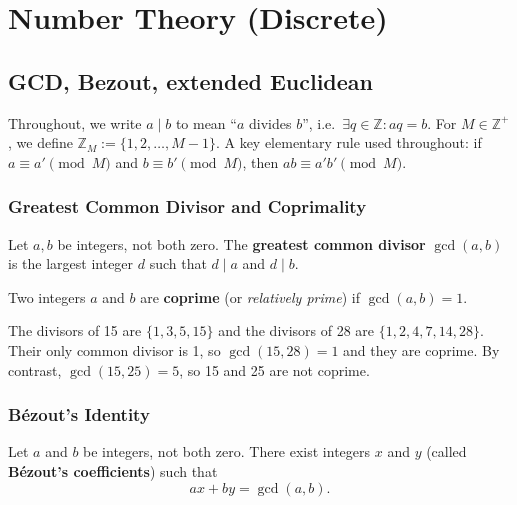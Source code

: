 
\section{Number Theory (Discrete)}

\subsection{GCD, Bezout, extended Euclidean}

\begin{remark}
Throughout, we write $a \mid b$ to mean ``$a$ divides $b$'', i.e.\ $\exists q \in \mathbb{Z} : aq = b$. For $M \in \mathbb{Z}^+$, we define $\mathbb{Z}_M := \{1, 2, \ldots, M-1\}$. A key elementary rule used throughout: if $a \equiv a' \pmod{M}$ and $b \equiv b' \pmod{M}$, then $ab \equiv a'b' \pmod{M}$.
\end{remark}

\subsubsection*{Greatest Common Divisor and Coprimality}

\begin{definition}
Let $a, b$ be integers, not both zero. The \textbf{greatest common divisor} $\gcd(a,b)$ is the largest integer $d$ such that $d \mid a$ and $d \mid b$.
\end{definition}

\begin{definition}
Two integers $a$ and $b$ are \textbf{coprime} (or \emph{relatively prime}) if $\gcd(a,b) = 1$.
\end{definition}

\begin{example}
The divisors of 15 are $\{1,3,5,15\}$ and the divisors of 28 are $\{1,2,4,7,14,28\}$. Their only common divisor is 1, so $\gcd(15,28)=1$ and they are coprime. By contrast, $\gcd(15,25)=5$, so 15 and 25 are not coprime.
\end{example}

\subsubsection*{Bézout's Identity}

\begin{theorem}
Let $a$ and $b$ be integers, not both zero. There exist integers $x$ and $y$ (called \textbf{Bézout's coefficients}) such that
\[
ax + by = \gcd(a,b).
\]
\end{theorem}

